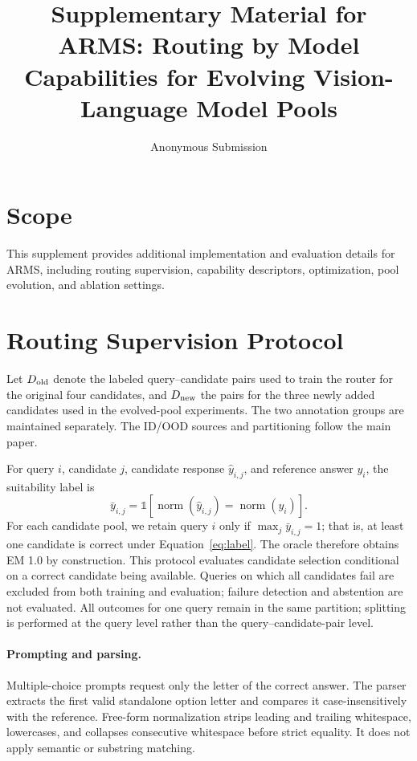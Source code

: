 \documentclass[letterpaper]{article}
\title{Supplementary Material for ARMS: Routing by Model Capabilities for
Evolving Vision-Language Model Pools}
\author{Anonymous Submission}
\begin{document}
\maketitle

\section{Scope}

This supplement provides additional implementation and evaluation details for
ARMS, including routing supervision, capability descriptors, optimization,
pool evolution, and ablation settings.

\section{Routing Supervision Protocol}

Let $D_{\rm old}$ denote the labeled query--candidate pairs used to train the
router for the original four candidates, and $D_{\rm new}$ the pairs for the
three newly added candidates used in the evolved-pool experiments. The two
annotation groups are maintained separately. The ID/OOD sources and
partitioning follow the main paper.

For query $i$, candidate $j$, candidate response $\hat y_{i,j}$, and reference
answer $y_i$, the suitability label is
\begin{equation}
\bar y_{i,j}=\mathbb{1}\!\left[
\operatorname{norm}(\hat y_{i,j})=
\operatorname{norm}(y_i)\right].
\label{eq:label}
\end{equation}
For each candidate pool, we retain query $i$ only if
$\max_j\bar y_{i,j}=1$; that is, at least one candidate is correct under
Equation~\ref{eq:label}. The oracle therefore obtains EM 1.0 by construction.
This protocol evaluates candidate selection conditional on a correct candidate
being available. Queries on which all candidates fail are excluded from both
training and evaluation; failure detection and abstention are not evaluated.
All outcomes for one query remain in the same partition; splitting is performed
at the query level rather than the query--candidate-pair level.

\paragraph{Prompting and parsing.}
Multiple-choice prompts request only the letter of the correct answer. The
parser extracts the first valid standalone option letter and compares it
case-insensitively with the reference. Free-form normalization strips leading
and trailing whitespace, lowercases, and collapses consecutive whitespace
before strict equality. It does not apply semantic or substring matching.
\end{document}
